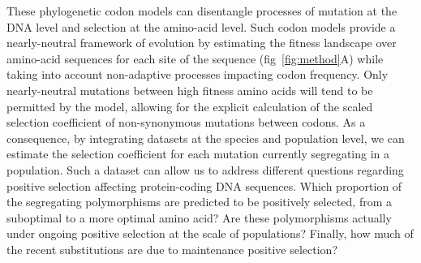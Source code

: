 \documentclass{article}
\begin{document}
    These phylogenetic codon models can disentangle processes of mutation at the DNA level and selection at the amino-acid level.
    Such codon models provide a nearly-neutral framework of evolution by estimating the fitness landscape over amino-acid sequences for each site of the sequence (fig~\ref{fig:method}A) while taking into account non-adaptive processes impacting codon frequency\cite{halpern_evolutionary_1998, rodrigue_mechanistic_2010, tamuri_estimating_2012}.
    Only nearly-neutral mutations between high fitness amino acids will tend to be permitted by the model, allowing for the explicit calculation of the scaled selection coefficient of non-synonymous mutations between codons.
    As a consequence, by integrating datasets at the species and population level, we can estimate the selection coefficient for each mutation currently segregating in a population.
    Such a dataset can allow us to address different questions regarding positive selection affecting protein-coding DNA sequences.
    Which proportion of the segregating polymorphisms are predicted to be positively selected, from a suboptimal to a more optimal amino acid?
    Are these polymorphisms actually under ongoing positive selection at the scale of populations?
    Finally, how much of the recent substitutions are due to maintenance positive selection?
\end{document}
